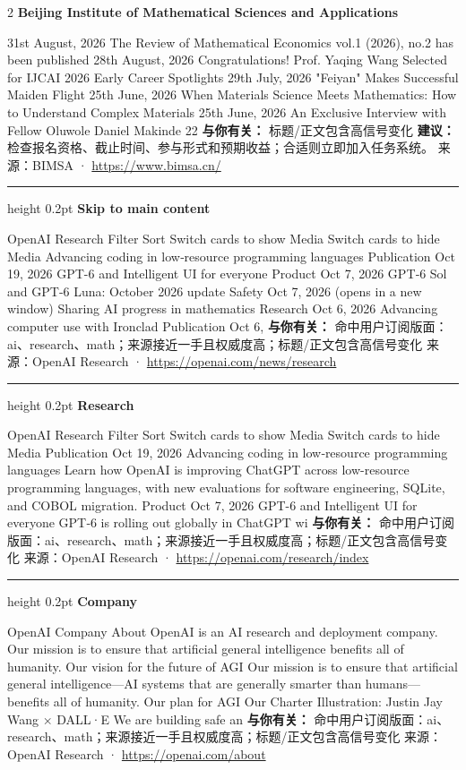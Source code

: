 \documentclass[10.5pt]{ctexart}
\begin{document}
\begin{multicols}{2}
{\large\bfseries Beijing Institute of Mathematical Sciences and Applications}\par
31st August, 2026 The Review of Mathematical Economics vol.1 (2026), no.2 has been published 28th August, 2026 Congratulations! Prof. Yaqing Wang Selected for IJCAI 2026 Early Career Spotlights 29th July, 2026 "Feiyan" Makes Successful Maiden Flight 25th June, 2026 When Materials Science Meets Mathematics: How to Understand Complex Materials 25th June, 2026 An Exclusive Interview with Fellow Oluwole Daniel Makinde 22
\textbf{与你有关：} 标题/正文包含高信号变化
\textbf{建议：} 检查报名资格、截止时间、参与形式和预期收益；合适则立即加入任务系统。
{\footnotesize\color{ormuted} 来源：BIMSA · \url{https://www.bimsa.cn/}}
\vspace{2mm}
\hrule height 0.2pt
\vspace{2mm}
{\large\bfseries Skip to main content}\par
OpenAI Research Filter Sort Switch cards to show Media Switch cards to hide Media Advancing coding in low‑resource programming languages Publication Oct 19, 2026 GPT-6 and Intelligent UI for everyone Product Oct 7, 2026 GPT‑6 Sol and GPT‑6 Luna: October 2026 update Safety Oct 7, 2026 (opens in a new window) Sharing AI progress in mathematics Research Oct 6, 2026 Advancing computer use with Ironclad Publication Oct 6,
\textbf{与你有关：} 命中用户订阅版面：ai、research、math；来源接近一手且权威度高；标题/正文包含高信号变化
{\footnotesize\color{ormuted} 来源：OpenAI Research · \url{https://openai.com/news/research}}
\vspace{2mm}
\hrule height 0.2pt
\vspace{2mm}
{\large\bfseries Research}\par
OpenAI Research Filter Sort Switch cards to show Media Switch cards to hide Media Publication Oct 19, 2026 Advancing coding in low‑resource programming languages Learn how OpenAI is improving ChatGPT across low-resource programming languages, with new evaluations for software engineering, SQLite, and COBOL migration. Product Oct 7, 2026 GPT-6 and Intelligent UI for everyone GPT‑6 is rolling out globally in ChatGPT wi
\textbf{与你有关：} 命中用户订阅版面：ai、research、math；来源接近一手且权威度高；标题/正文包含高信号变化
{\footnotesize\color{ormuted} 来源：OpenAI Research · \url{https://openai.com/research/index}}
\vspace{2mm}
\hrule height 0.2pt
\vspace{2mm}
{\large\bfseries Company}\par
OpenAI Company About OpenAI is an AI research and deployment company. Our mission is to ensure that artificial general intelligence benefits all of humanity. Our vision for the future of AGI Our mission is to ensure that artificial general intelligence—AI systems that are generally smarter than humans—benefits all of humanity. Our plan for AGI Our Charter Illustration: Justin Jay Wang × DALL·E We are building safe an
\textbf{与你有关：} 命中用户订阅版面：ai、research、math；来源接近一手且权威度高；标题/正文包含高信号变化
{\footnotesize\color{ormuted} 来源：OpenAI Research · \url{https://openai.com/about}}
\end{multicols}
\end{document}
